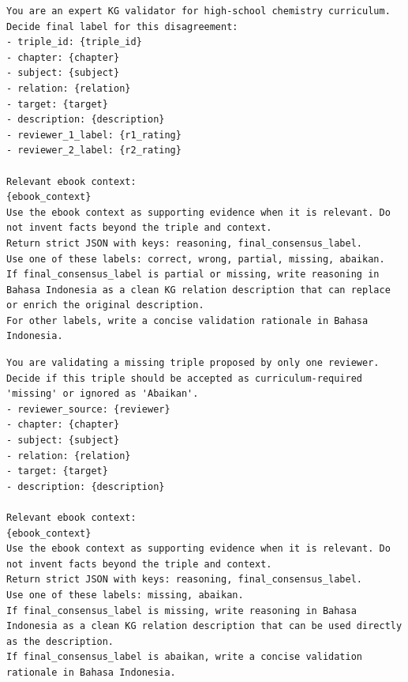 \documentclass[../../thesis]{subfiles}
\begin{document}
\begin{lstlisting}[style=promptbox,caption={Prompt judge untuk ketidaksepakatan label rating.},label={lst:judge-disagreed}]
You are an expert KG validator for high-school chemistry curriculum.
Decide final label for this disagreement:
- triple_id: {triple_id}
- chapter: {chapter}
- subject: {subject}
- relation: {relation}
- target: {target}
- description: {description}
- reviewer_1_label: {r1_rating}
- reviewer_2_label: {r2_rating}

Relevant ebook context:
{ebook_context}
Use the ebook context as supporting evidence when it is relevant. Do not invent facts beyond the triple and context.
Return strict JSON with keys: reasoning, final_consensus_label.
Use one of these labels: correct, wrong, partial, missing, abaikan.
If final_consensus_label is partial or missing, write reasoning in Bahasa Indonesia as a clean KG relation description that can replace or enrich the original description.
For other labels, write a concise validation rationale in Bahasa Indonesia.
\end{lstlisting}

\begin{lstlisting}[style=promptbox,caption={Prompt judge untuk missing triple yang diusulkan satu pakar.},label={lst:judge-missing}]
You are validating a missing triple proposed by only one reviewer.
Decide if this triple should be accepted as curriculum-required 'missing' or ignored as 'Abaikan'.
- reviewer_source: {reviewer}
- chapter: {chapter}
- subject: {subject}
- relation: {relation}
- target: {target}
- description: {description}

Relevant ebook context:
{ebook_context}
Use the ebook context as supporting evidence when it is relevant. Do not invent facts beyond the triple and context.
Return strict JSON with keys: reasoning, final_consensus_label.
Use one of these labels: missing, abaikan.
If final_consensus_label is missing, write reasoning in Bahasa Indonesia as a clean KG relation description that can be used directly as the description.
If final_consensus_label is abaikan, write a concise validation rationale in Bahasa Indonesia.
\end{lstlisting}
\end{document}
